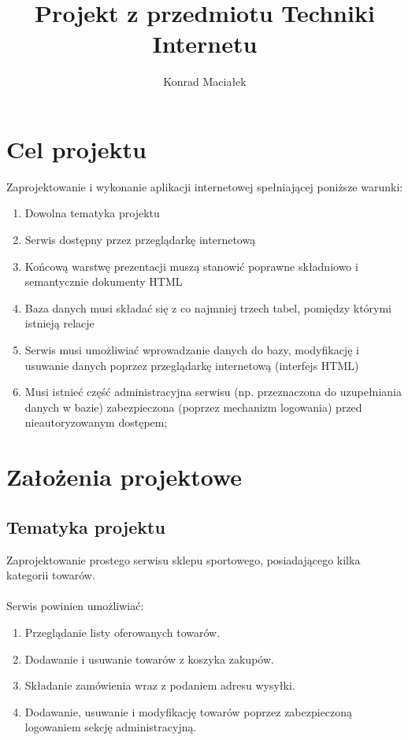 \documentclass[a4paper,10pt]{article}
\title{Projekt z przedmiotu Techniki Internetu}
\author{Konrad Maciałek}
\begin{document}
\maketitle
\newpage

\section{Cel projektu}
Zaprojektowanie i wykonanie aplikacji internetowej spełniającej poniższe warunki:
\begin{enumerate}
 \item Dowolna tematyka projektu
 \item Serwis dostępny przez przeglądarkę internetową
 \item Końcową warstwę prezentacji muszą stanowić poprawne składniowo i semantycznie dokumenty HTML
 \item Baza danych musi składać się z co najmniej trzech tabel, pomiędzy którymi istnieją relacje
 \item Serwis musi umożliwiać wprowadzanie danych do bazy, modyfikację i usuwanie danych poprzez przeglądarkę internetową (interfejs HTML)
 \item Musi istnieć część administracyjna serwisu (np. przeznaczona do uzupełniania danych w bazie) zabezpieczona (poprzez mechanizm logowania) przed nieautoryzowanym dostępem;
\end{enumerate}

\section{Założenia projektowe}
\subsection{Tematyka projektu}
Zaprojektowanie prostego serwisu sklepu sportowego, posiadającego kilka kategorii towarów. 
\paragraph{}
Serwis powinien umożliwiać:
\begin{enumerate}
 \item Przeglądanie listy oferowanych towarów.
 \item Dodawanie i usuwanie towarów z koszyka zakupów.
 \item Składanie zamówienia wraz z podaniem adresu wysyłki.
 \item Dodawanie, usuwanie i modyfikację towarów poprzez zabezpieczoną logowaniem sekcję administracyjną.
\end{enumerate}
\end{document}
